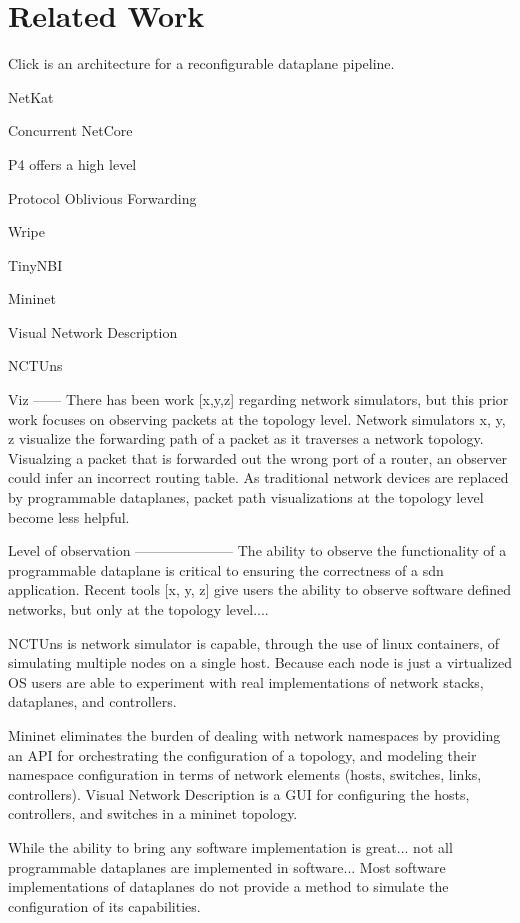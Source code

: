 \section{Related Work}


Click \cite{click} is an architecture for a reconfigurable dataplane pipeline.

NetKat\cite{netkat}

Concurrent NetCore\cite{cnetcore}

P4\cite{p4} offers a high level

Protocol Oblivious Forwarding\cite{pof}

Wripe \cite{wripe}

TinyNBI \cite{tinynbi}

Mininet\cite{mininet}

Visual Network Description \cite{vnd}

NCTUns \cite{nctuns}

Viz
------
There has been work [x,y,z] regarding network simulators, but this prior work focuses on observing packets at the topology level. Network simulators x, y, z visualize the forwarding path of a packet as it traverses a network topology. Visualzing a packet that is forwarded out the wrong port of a router, an observer could infer an incorrect routing table. As traditional network devices are replaced by programmable dataplanes, packet path visualizations at the topology level become less helpful.

Level of observation
---------------------
The ability to observe the functionality of a programmable dataplane is 
critical to ensuring the correctness of a sdn application. 
Recent tools [x, y, z] give users the ability to observe software defined
networks, but only at the topology level....  

NCTUns \cite{nctuns} is network simulator is capable, through the use of linux
containers, of simulating multiple nodes on a single host. Because each 
node is just a virtualized OS users are able to experiment with real 
implementations of network stacks, dataplanes, and controllers. 

Mininet \cite{mininet} eliminates the burden of dealing with network namespaces 
by providing an API for orchestrating the configuration of a topology, and 
modeling their namespace configuration in terms of network elements (hosts, 
switches, links, controllers). Visual Network Description \cite{vnd} is a 
GUI for configuring the hosts, controllers, and switches in a mininet
topology.

While the ability to bring any software implementation is great... not all
programmable dataplanes are implemented in software... Most software
implementations of dataplanes do not provide a method to simulate
the configuration of its capabilities.  

